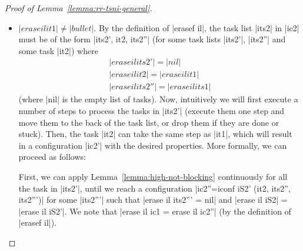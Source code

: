 \begin{proof}[Proof of Lemma~\ref{lemma:rr-tsni-general}]
\begin{itemize}
    \item $|erase il it1|\neq|bullet|$.
    By the definition of |erasef il|, the task list |its2|
    in |ic2| must be of the
    form |its2', it2, its2''| (for some task lists |its2'|, |its2''| and
    some task |it2|)
    where
    \begin{align}
    |erase il its2'| = |nil| \\
    |erase il it2| = |erase il it1| \\
    |erase il its2''| = |erase il its1|
    \end{align}
    (where |nil| is the empty list of tasks).
    Now, intuitively we will first execute a number of steps to process
    the tasks in |its2'| (execute them one step and move them to the back
    of the task list, or drop them if they are done or stuck).  Then, the task
    |it2| can take the same step as |it1|, which will result in a configuration
    |ic2'|
    with the desired properties.
    More formally, we can proceed as follows:
    
    First, we can apply Lemma~\ref{lemma:high-not-blocking} continuously
    for all the task in |its2'|,
    until we reach a configuration |ic2''=iconf iS2' (it2, its2'', its2''')|
    for some |its2'''| such
    that |erase il its2''' = nil| and |erase il iS2| = |erase il iS2'|.
    We note that |erase il ic1 = erase il ic2''| (by the definition of
    |erasef il|).
    

\end{itemize}
\end{proof}
